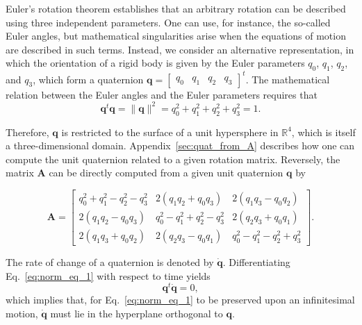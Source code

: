 \documentclass[aip,jcp,reprint,amsmath,amssymb,raggedbottom]{revtex4-1}
\newcommand{\mt}[1]{\boldsymbol{\mathbf{#1}}}           %
\newcommand{\vt}[1]{\boldsymbol{\mathbf{#1}}}           %
\newcommand{\tr}[1]{#1^t}                               %
\begin{document}
Euler's rotation theorem establishes that an arbitrary rotation can be described using three independent parameters. One can use, for instance, the so-called Euler angles, but mathematical singularities arise when the equations of motion are described in such terms. Instead, we consider an alternative representation, in which the orientation of a rigid body is given by the Euler parameters $q_0$, $q_1$, $q_2$, and $q_3$, which form a quaternion $\vt q = \tr {[\begin{array}{cccc} q_0 & q_1 & q_2 & q_3 \end{array}]}$. The mathematical relation between the Euler angles and the Euler parameters requires that\cite{Goldstein2002}
\begin{equation}
\label{eq:norm_eq_1}
\tr{\vt q}{\vt q} = \|\vt q\|^2 = q_0^2 + q_1^2 + q_2^2 + q_3^2 = 1.
\end{equation}

Therefore, $\vt q$ is restricted to the surface of a unit hypersphere in $\mathbb{R}^4$, which is itself a three-dimensional domain. Appendix~\ref{sec:quat_from_A} describes how one can compute the unit quaternion related to a given rotation matrix. Reversely, the matrix $\mt A$ can be directly computed from a given unit quaternion $\vt q$ by\cite{Allen1989,Miller2002}
\begin{widetext}
\begin{equation}
\label{eq:A_from_q}
\mt A = \left[ \begin{array}{ccc}
q_0^2 + q_1^2 - q_2^2 - q_3^2 & 2(q_1 q_2 + q_0 q_3) & 2(q_1 q_3 - q_0 q_2) \\
2(q_1 q_2 - q_0 q_3) & q_0^2 - q_1^2 + q_2^2 - q_3^2 & 2(q_2 q_3 + q_0 q_1) \\
2(q_1 q_3 + q_0 q_2) & 2(q_2 q_3 - q_0 q_1) & q_0^2 - q_1^2 - q_2^2 + q_3^2  
\end{array} \right].
\end{equation}
\end{widetext}

The rate of change of a quaternion is denoted by $\dot{\vt q}$. Differentiating Eq.~\ref{eq:norm_eq_1} with respect to time yields
\begin{equation}
\label{eq:diff_qTq}
\tr{\vt q}\dot{\vt q} = 0,
\end{equation}
which implies that, for Eq.~\ref{eq:norm_eq_1} to be preserved upon an infinitesimal motion, $\dot{\vt q}$ must lie in the hyperplane orthogonal to $\vt q$.
\end{document}
